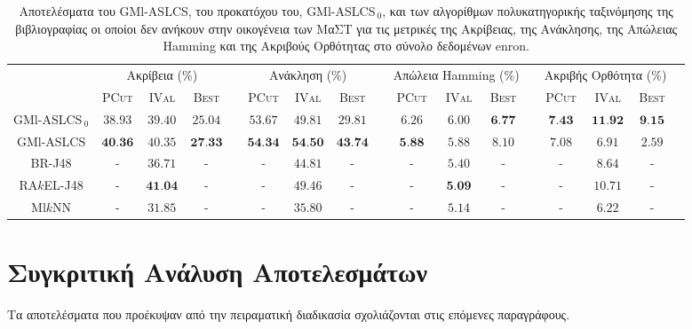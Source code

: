 \begin{landscape}
\begin{table}
\begin{center}
\caption[Αποτελέσματα στο σύνολο δεδομένων enron.]{Αποτελέσματα του GMl-ASLCS, του προκατόχου του, GMl-ASLCS$_{\:0}$, και των αλγορίθμων πολυκατηγορικής ταξινόμησης της βιβλιογραφίας οι οποίοι δεν ανήκουν στην οικογένεια των ΜαΣΤ για τις μετρικές της Ακρίβειας, της Ανάκλησης, της Απώλειας Hamming και της Ακριβούς Ορθότητας στο σύνολο δεδομένων enron.}
\label{table:enronEvals}
\begin{tabular}{ccccccccccccccccc}
				& \multicolumn{3}{c}{Ακρίβεια (\%)} & & \multicolumn{3}{c}{Ανάκληση (\%)} & & \multicolumn{3}{c}{Απώλεια Hamming (\%)} & & \multicolumn{3}{c}{Ακριβής Ορθότητα (\%)}
\\ 
\cline{2-4} \cline{6-8} \cline{10-12} \cline{14-16}
& \textsc{PCut} & \textsc{IVal} & \textsc{Best} & & \textsc{PCut} & \textsc{IVal} & \textsc{Best} & & \textsc{PCut} & \textsc{IVal} & \textsc{Best} & & \textsc{PCut} & \textsc{IVal} & \textsc{Best}\\ \hline
GMl-ASLCS$_{\:0}$ & $38.93$ & $39.40$ & $25.04$ & & $53.67$ & $49.81$ & $29.81$ & & $6.26$ & $6.00$ & $\textbf{6.77}$ & & $\textbf{7.43}$ & $\textbf{11.92}$  & $\textbf{9.15}$ \\ 
GMl-ASLCS 		  & $\textbf{40.36}$ & $40.35$ & $\textbf{27.33}$ & & $\textbf{54.34}$ & $\textbf{54.50}$ & $\textbf{43.74}$ & & $\textbf{5.88}$	& $5.88$ & $8.10$	& & $7.08$ & $6.91$	& $2.59$ \\
\hline
\hline
BR-J48 			  & - & $36.71$ & - & & - & $44.81$ & - & & -	& $5.40$ & -	& & - & $8.64$	& - \\
RA$k$EL-J48 	  & - & $\textbf{41.04}$ & - & & - & $49.46$ & - & & -	& $\textbf{5.09}$ & -	& & - & $10.71$	& - \\
Ml$k$NN 		  & - & $31.85$ & - & & - & $35.80$ & - & & -	& $5.14$ & -	& & - & $6.22$	& - \\
\hline

\end{tabular} 
\end{center}
\end{table}
\end{landscape}


\section{Συγκριτική Ανάλυση Αποτελεσμάτων}
Τα αποτελέσματα που προέκυψαν από την πειραματική διαδικασία σχολιάζονται στις επόμενες παραγράφους.

